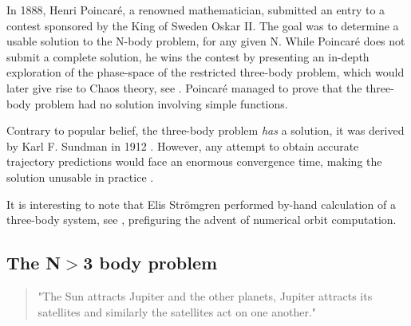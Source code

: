 In 1888, Henri Poincar\'e, a renowned mathematician, submitted an entry to a contest sponsored by the King of Sweden Oskar II. The goal was to determine a usable solution to the N-body problem, for any given N. While Poincar\'e does not submit a complete solution, he wins the contest by presenting an in-depth exploration of the phase-space of the restricted three-body problem, which would later give rise to Chaos theory, see \cite{Yoccoz2010}. Poincar\'e managed to prove that the three-body problem had no  solution involving simple functions.

Contrary to popular belief, the three-body problem \textit{has} a solution, it was derived by Karl F. Sundman in 1912 \citep{Sundman1912}. However, any attempt to obtain accurate trajectory predictions would face an enormous convergence time, making the solution unusable in practice \citep{Beloriszky1930}.

It is interesting to note that Elis Str\"omgren performed by-hand calculation of a three-body system, see \cite{Aarseth2003,Stromgren1909}, prefiguring the advent of numerical orbit computation.

\subsection*{The N$>$3 body problem}

\begin{quote}
"The Sun attracts Jupiter and the other planets, Jupiter attracts its satellites and similarly the satellites act on one another."
\end{quote}



